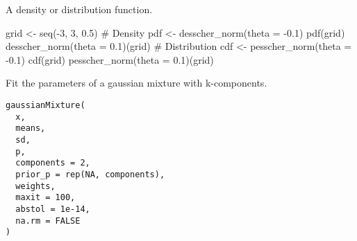 \documentclass[a4paper]{book}
\begin{document}
%
\begin{Value}
A density or distribution function.
\end{Value}
%
\begin{Examples}
\begin{ExampleCode}
grid <- seq(-3, 3, 0.5)
# Density
pdf <- desscher_norm(theta = -0.1)
pdf(grid)
desscher_norm(theta = 0.1)(grid)
# Distribution
cdf <- pesscher_norm(theta = -0.1)
cdf(grid)
pesscher_norm(theta = 0.1)(grid)

\end{ExampleCode}
\end{Examples}
%
\begin{Description}\relax
Fit the parameters of a gaussian mixture with k-components.
\end{Description}
%
\begin{Usage}
\begin{verbatim}
gaussianMixture(
  x,
  means,
  sd,
  p,
  components = 2,
  prior_p = rep(NA, components),
  weights,
  maxit = 100,
  abstol = 1e-14,
  na.rm = FALSE
)
\end{verbatim}
\end{Usage}
%
\end{document}
